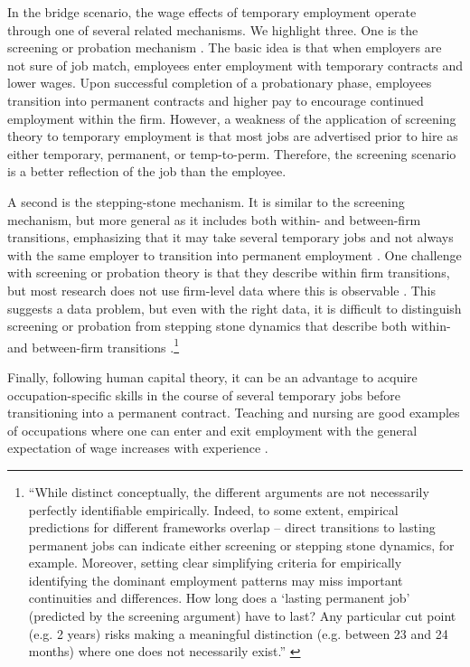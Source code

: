 \documentclass[12pt]{article}
\begin{document}
In the bridge scenario, the wage effects of temporary employment operate through one of several related mechanisms.  We highlight three.  One is the screening or probation mechanism \citep{stiglitz_theory_1975,wang_weiss_1998,loh1994employment}.   The basic idea is that when employers are not sure of job match, employees enter employment with temporary contracts and lower wages.  Upon successful completion of a probationary phase, employees transition into permanent contracts and higher pay to encourage continued employment within the firm.  However, a weakness of the application of screening theory to temporary employment is that most jobs are advertised prior to hire as either temporary, permanent, or temp-to-perm.  Therefore, the screening scenario is a better reflection of the job than the employee.

A second is the stepping-stone mechanism.  It is similar to the screening mechanism, but more general as it includes both within- and between-firm transitions, emphasizing that it may take several temporary jobs and not always with the same employer to transition into permanent employment \citep{scherer_stepping-stones_2004}.  One challenge with screening or probation theory is that they describe within firm transitions, but most research does not use firm-level data where this is observable \citep{mattijssen_scarred_2022}.  This suggests a data problem, but even with the right data, it is difficult to distinguish screening or probation from stepping stone dynamics that describe both within- and between-firm transitions \citep{fuller_career_2015}.\footnote{``While distinct conceptually, the different arguments are not necessarily perfectly identifiable empirically. Indeed, to some extent, empirical predictions for different frameworks overlap – direct transitions to lasting permanent jobs can indicate either screening or stepping stone dynamics, for example. Moreover, setting clear simplifying criteria for empirically identifying the dominant employment patterns may miss important continuities and differences.  How long does a `lasting permanent job' (predicted by the screening argument) have to last? Any particular cut point (e.g. 2 years) risks making a meaningful distinction (e.g. between 23 and 24 months) where one does not necessarily exist.''  \citealp[pg. 81]{fuller_career_2015}}  

Finally, following human capital theory, it can be an advantage to acquire occupation-specific skills in the course of several temporary jobs before transitioning into a permanent contract.  Teaching and nursing are good examples of occupations where one can enter and exit employment with the general expectation of wage increases with experience \citep{booth_temporary_2002}.  
\end{document}
